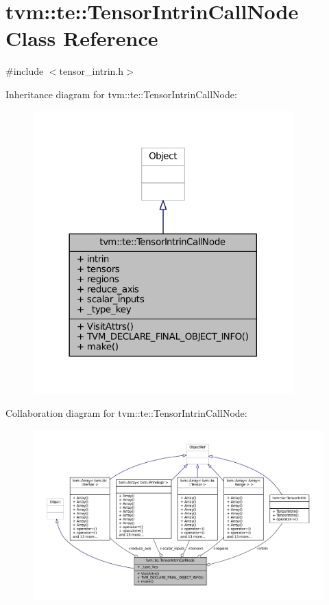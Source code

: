 \hypertarget{classtvm_1_1te_1_1TensorIntrinCallNode}{}\section{tvm\+:\+:te\+:\+:Tensor\+Intrin\+Call\+Node Class Reference}
\label{classtvm_1_1te_1_1TensorIntrinCallNode}


{\ttfamily \#include $<$tensor\+\_\+intrin.\+h$>$}



Inheritance diagram for tvm\+:\+:te\+:\+:Tensor\+Intrin\+Call\+Node\+:
\nopagebreak
\begin{figure}[H]
\begin{center}
\leavevmode
\includegraphics[width=285pt]{classtvm_1_1te_1_1TensorIntrinCallNode__inherit__graph}
\end{center}
\end{figure}


Collaboration diagram for tvm\+:\+:te\+:\+:Tensor\+Intrin\+Call\+Node\+:
\nopagebreak
\begin{figure}[H]
\begin{center}
\leavevmode
\includegraphics[width=350pt]{classtvm_1_1te_1_1TensorIntrinCallNode__coll__graph}
\end{center}
\end{figure}

